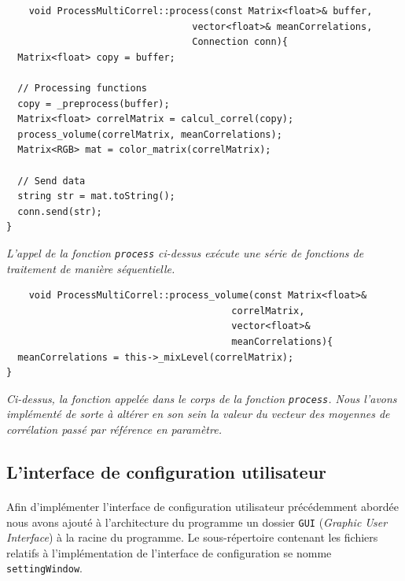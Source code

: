   \begin{lstlisting}
    void ProcessMultiCorrel::process(const Matrix<float>& buffer,
                                 vector<float>& meanCorrelations,
                                 Connection conn){
  Matrix<float> copy = buffer;

  // Processing functions
  copy = _preprocess(buffer);
  Matrix<float> correlMatrix = calcul_correl(copy);
  process_volume(correlMatrix, meanCorrelations);
  Matrix<RGB> mat = color_matrix(correlMatrix);

  // Send data
  string str = mat.toString();
  conn.send(str);
}
  \end{lstlisting}
  \begin{center}
    \textit{L'appel de la fonction \verb!process! ci-dessus exécute une série de fonctions de traitement de manière séquentielle.}
  \end{center}

  \begin{lstlisting}
    void ProcessMultiCorrel::process_volume(const Matrix<float>&
                                        correlMatrix,
                                        vector<float>&
                                        meanCorrelations){
  meanCorrelations = this->_mixLevel(correlMatrix);
}
  \end{lstlisting}
  \begin{center}
    \textit{Ci-dessus, la fonction appelée dans le corps de la fonction \verb!process!. Nous l'avons implémenté de sorte à altérer en son sein la valeur du vecteur des moyennes de corrélation passé par référence en paramètre.}
  \end{center}

\subsection{L'interface de configuration utilisateur}
\paragraph{}
Afin d'implémenter l'interface de configuration utilisateur précédemment abordée
nous avons ajouté à l'architecture du programme un dossier
\verb!GUI! (\textit{Graphic User Interface}) à la racine du programme.
Le sous-répertoire contenant les fichiers relatifs à l'implémentation de
l'interface de configuration se nomme \verb!settingWindow!.

